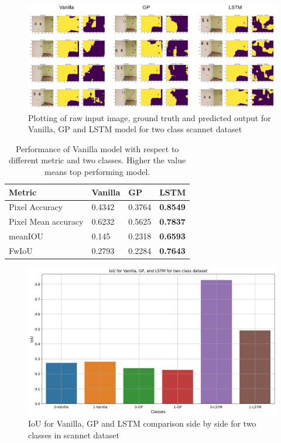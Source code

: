	\begin{figure}[h]
		\centering
		\includegraphics[width=16cm]{images/output_unet_two_classes.png}
		\caption{Plotting of raw input image, ground truth and predicted output for Vanilla, GP and LSTM model for two class scannet dataset}
		\label{fig:output_vanilla}
	\end{figure}
	
	\begin{table}[h]
		\begin{center}
			\begin{tabular}{ | l | l | l | p{4cm} |}
				\hline
				
				\cellcolor{purple!30}Metric & \cellcolor{purple!30}Vanilla & \cellcolor{purple!30}GP & \cellcolor{purple!30}LSTM\\ \hline
				Pixel Accuracy & 0.4342 & 0.3764 & { \bf 0.8549 }\\ \hline
				Pixel Mean accuracy & 0.6232 & 0.5625 & { \bf 0.7837 }  \\ \hline
				meanIOU & 0.145 & 0.2318 & { \bf 0.6593 }  \\ \hline
				FwIoU & 0.2793 & 0.2284 & { \bf 0.7643 } \\ \hline
				\hline
			\end{tabular}
			\caption{Performance of Vanilla model with respect to different metric and two classes. Higher the value means top performing model.}
			\label{table:unet_two_classes}
		\end{center}
	\end{table}

	\begin{figure}
		\centering
		\includegraphics[width=12cm]{images/iou_vanilla_gp_lstm_two_classes.png}
		\caption{IoU for Vanilla, GP and LSTM comparison side by side for two classes in scannet dataset}
		\label{fig:unet_model_metric_comparison}
	\end{figure}
	
